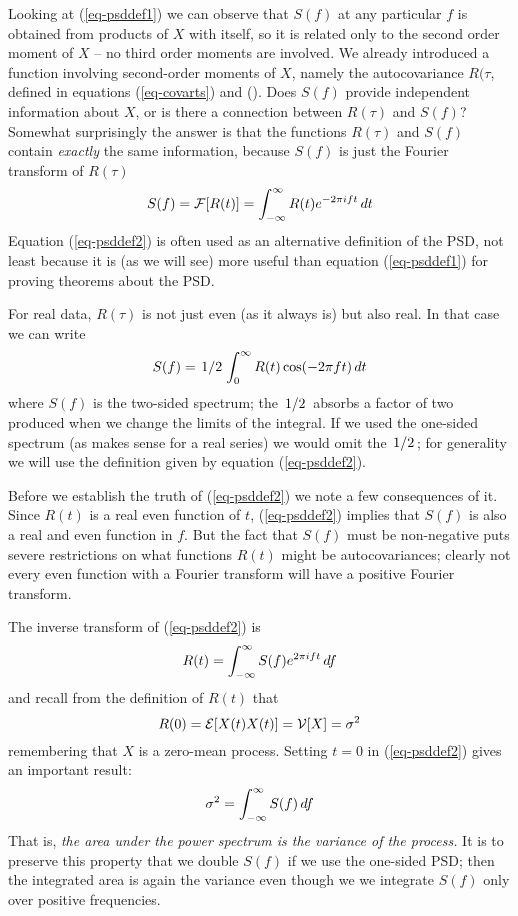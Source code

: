 \documentclass[12pt]{article}\usepackage{graphicx, color}
\begin{document}
Looking at (\ref{eq-psddef1}) we can observe that $S(f) $ at any particular $f$
is obtained from products of $X$ with itself,
so it is related only to the second order moment of $X$
-- no third order moments are involved.
We already introduced a function
involving second-order moments of $X$, namely
the autocovariance $R(\tau$,
defined in equations (\ref{eq-covarts}) and (\label{eq-covarco}).
Does $S(f)$ provide independent information about $X$,
or is there a connection between $R(\tau)$ and $S(f)$?
Somewhat surprisingly the answer is that the
functions $R(\tau)$ and $S(f)$
contain \textit{exactly} the same information,
because $S(f)$ is just the Fourier transform of $R(\tau)$
%
\begin{equation}
\label{eq-psddef2}
S(f) = \mathcal{F} [ R(t) ] =
\int_{- \infty} ^{\infty} R(t) e ^ {-2 \pi i ft} \, dt
\end{equation}
%
Equation (\ref{eq-psddef2}) is often used as an alternative definition
of the PSD,
not least because it is
(as we will see)
more useful than equation (\ref{eq-psddef1})
for proving theorems about the PSD.

For real data, $R(\tau)$ is not just even (as it always is)
but also real.
In that case we can write
%
\begin{equation}
\label{eq-psddef3}
S(f) = \left.1\middle/2\right. \int_0^{\infty} R(t) \cos(-2 \pi ft) \, dt
\end{equation}
%
where $S(f)$ is the two-sided spectrum;
the $\left.1\middle/2\right.$ absorbs a factor of two
produced when we change the limits of the integral.
If we used the one-sided spectrum (as makes
sense for a real series) we would omit
the $\left.1\middle/2\right.$;
for generality
we will use the definition given by equation (\ref{eq-psddef2}).

Before we establish the truth of (\ref{eq-psddef2}) we note a few
consequences of it.
Since $R(t)$ is a real even function of $t$, (\ref{eq-psddef2})
implies that $S(f)$ is also a real and even function in $f$.
But the fact that
$S(f)$ must be non-negative puts severe restrictions on what
functions $R(t)$ might be autocovariances; clearly
not every even function
with a Fourier transform will have a positive
Fourier transform.

The inverse transform of (\ref{eq-psddef2}) is
%
\begin{equation}
\label{eq-psdinv}
R(t) = \int_{- \infty} ^{\infty} S(f) e ^ {2 \pi i ft} \, df
\end{equation}
%
and recall from the definition of $R(t)$ that
%
\[
R(0) = \mathcal{E} [X(t) X(t)] = \mathcal{V} [X] = \sigma ^ 2
\]
%
remembering that $X$ is a zero-mean process.
Setting $t = 0$ in
(\ref{eq-psddef2}) gives an important result:
%
\begin{equation}
\label{eq-psdnorm}
\sigma ^ 2 = \int_{- \infty} ^{\infty} S (f) \, df
\end{equation}
%
That is,
\textit{the area under the power spectrum is the variance
of the process.}
It is to preserve this property that
we double $S(f)$ if we use the one-sided PSD;
then the integrated area is again the variance even though we
we integrate $S(f)$ only over positive frequencies.
\end{document}
